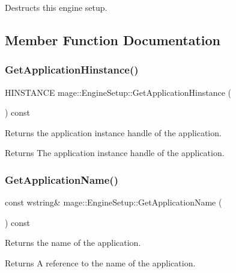 Destructs this engine setup. 

\subsection{Member Function Documentation}
\hypertarget{structmage_1_1_engine_setup_a2d9220896adfe924ac72165b4e2b13cf}{}\label{structmage_1_1_engine_setup_a2d9220896adfe924ac72165b4e2b13cf} 
\subsubsection{\texorpdfstring{Get\+Application\+Hinstance()}{GetApplicationHinstance()}}
{\footnotesize\ttfamily H\+I\+N\+S\+T\+A\+N\+CE mage\+::\+Engine\+Setup\+::\+Get\+Application\+Hinstance (\begin{DoxyParamCaption}{ }\end{DoxyParamCaption}) const}

Returns the application instance handle of the application.

\begin{DoxyReturn}{Returns}
The application instance handle of the application. 
\end{DoxyReturn}
\hypertarget{structmage_1_1_engine_setup_a63fed5e978c020ebc9d5080fe6fcefdc}{}\label{structmage_1_1_engine_setup_a63fed5e978c020ebc9d5080fe6fcefdc} 
\subsubsection{\texorpdfstring{Get\+Application\+Name()}{GetApplicationName()}}
{\footnotesize\ttfamily const wstring\& mage\+::\+Engine\+Setup\+::\+Get\+Application\+Name (\begin{DoxyParamCaption}{ }\end{DoxyParamCaption}) const}

Returns the name of the application.

\begin{DoxyReturn}{Returns}
A reference to the name of the application. 
\end{DoxyReturn}
\hypertarget{structmage_1_1_engine_setup_ad7066882519b59ca533293f743334508}{}\label{structmage_1_1_engine_setup_ad7066882519b59ca533293f743334508} 
